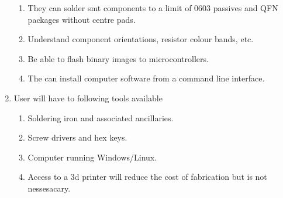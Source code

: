 \documentclass[12pt,a4paper]{article}
\begin{document}
\begin{enumerate}[label*=\arabic*.]
		\begin{enumerate}[label*=\arabic*.]
		\item They can solder \gls{smt} components to a limit of 0603 passives and QFN packages without centre pads. 
		\item Understand component orientations, resistor colour bands, etc.
		\item Be able to flash binary images to microcontrollers.
		\item The can install computer software from a command line interface.
		\end{enumerate}
\item User will have to following tools available
		\begin{enumerate}[label*=\arabic*.]
		\item Soldering iron and associated ancillaries.
		\item Screw drivers and hex keys.
		\item Computer running Windows/Linux.
		\item Access to a \gls{3d} printer will reduce the cost of fabrication but is not nessesacary.
		\end{enumerate}
\end{enumerate}
\end{document}
